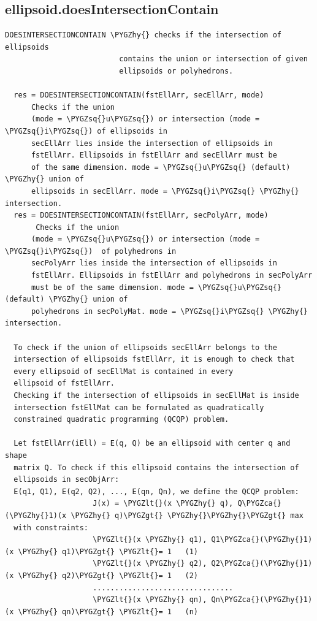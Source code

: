 \documentclass[letterpaper,10pt,english]{sphinxmanual}
\def\PYGZca{\char`\^}
\def\PYGZlt{\char`\<}
\def\PYGZgt{\char`\>}
\def\PYGZhy{\char`\-}
\def\PYGZsq{\char`\'}
\begin{document}
\subsection{ellipsoid.doesIntersectionContain}
\label{chap_functions:ellipsoid-doesintersectioncontain}
\begin{Verbatim}[commandchars=\\\{\}]
DOESINTERSECTIONCONTAIN \PYGZhy{} checks if the intersection of ellipsoids
                          contains the union or intersection of given
                          ellipsoids or polyhedrons.

  res = DOESINTERSECTIONCONTAIN(fstEllArr, secEllArr, mode)
      Checks if the union
      (mode = \PYGZsq{}u\PYGZsq{}) or intersection (mode = \PYGZsq{}i\PYGZsq{}) of ellipsoids in
      secEllArr lies inside the intersection of ellipsoids in
      fstEllArr. Ellipsoids in fstEllArr and secEllArr must be
      of the same dimension. mode = \PYGZsq{}u\PYGZsq{} (default) \PYGZhy{} union of
      ellipsoids in secEllArr. mode = \PYGZsq{}i\PYGZsq{} \PYGZhy{} intersection.
  res = DOESINTERSECTIONCONTAIN(fstEllArr, secPolyArr, mode)
       Checks if the union
      (mode = \PYGZsq{}u\PYGZsq{}) or intersection (mode = \PYGZsq{}i\PYGZsq{})  of polyhedrons in
      secPolyArr lies inside the intersection of ellipsoids in
      fstEllArr. Ellipsoids in fstEllArr and polyhedrons in secPolyArr
      must be of the same dimension. mode = \PYGZsq{}u\PYGZsq{} (default) \PYGZhy{} union of
      polyhedrons in secPolyMat. mode = \PYGZsq{}i\PYGZsq{} \PYGZhy{} intersection.

  To check if the union of ellipsoids secEllArr belongs to the
  intersection of ellipsoids fstEllArr, it is enough to check that
  every ellipsoid of secEllMat is contained in every
  ellipsoid of fstEllArr.
  Checking if the intersection of ellipsoids in secEllMat is inside
  intersection fstEllMat can be formulated as quadratically
  constrained quadratic programming (QCQP) problem.

  Let fstEllArr(iEll) = E(q, Q) be an ellipsoid with center q and shape
  matrix Q. To check if this ellipsoid contains the intersection of
  ellipsoids in secObjArr:
  E(q1, Q1), E(q2, Q2), ..., E(qn, Qn), we define the QCQP problem:
                    J(x) = \PYGZlt{}(x \PYGZhy{} q), Q\PYGZca{}(\PYGZhy{}1)(x \PYGZhy{} q)\PYGZgt{} \PYGZhy{}\PYGZhy{}\PYGZgt{} max
  with constraints:
                    \PYGZlt{}(x \PYGZhy{} q1), Q1\PYGZca{}(\PYGZhy{}1)(x \PYGZhy{} q1)\PYGZgt{} \PYGZlt{}= 1   (1)
                    \PYGZlt{}(x \PYGZhy{} q2), Q2\PYGZca{}(\PYGZhy{}1)(x \PYGZhy{} q2)\PYGZgt{} \PYGZlt{}= 1   (2)
                    ................................
                    \PYGZlt{}(x \PYGZhy{} qn), Qn\PYGZca{}(\PYGZhy{}1)(x \PYGZhy{} qn)\PYGZgt{} \PYGZlt{}= 1   (n)


\end{Verbatim}
\end{document}
